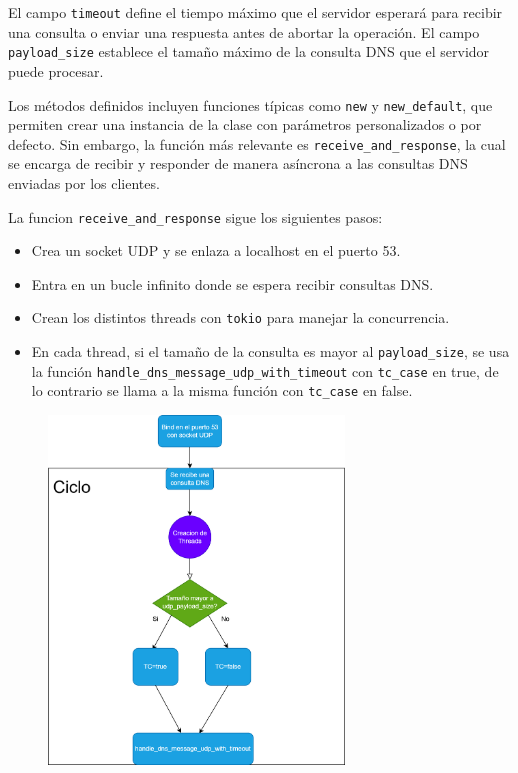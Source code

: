 
El campo \texttt{timeout} define el tiempo máximo que el servidor esperará para recibir una consulta o enviar una respuesta antes de abortar la operación.
El campo \texttt{payload\_size} establece el tamaño máximo de la consulta DNS que el servidor puede procesar.


Los métodos definidos incluyen funciones típicas como \texttt{new} y \texttt{new\_default}, que permiten crear 
una instancia de la clase con parámetros personalizados o por defecto. Sin embargo, la función más relevante es \texttt{receive\_and\_response}, 
la cual se encarga de recibir y responder de manera asíncrona a las consultas DNS enviadas por los clientes.


La funcion \texttt{receive\_and\_response} sigue los siguientes pasos:
\begin{itemize}
    \item Crea un socket UDP y se enlaza a localhost en el puerto 53.
    \item Entra en un bucle infinito donde se espera recibir consultas DNS.
    \item Crean los distintos threads con \texttt{tokio} para manejar la concurrencia.
    \item En cada thread, si el tamaño de la consulta es mayor al \texttt{payload\_size}, se usa la función \texttt{handle\_dns\_message\_udp\_with\_timeout}
          con \texttt{tc\_case} en true, de lo contrario se llama a la misma función con \texttt{tc\_case} en false.
\end{itemize}


\begin{figure}[h!]
    \centering
    \includegraphics[width=0.7\textwidth]{diagramas/recieve_and_response.png}
    \label{fig:udp_flowchart}
\end{figure}


